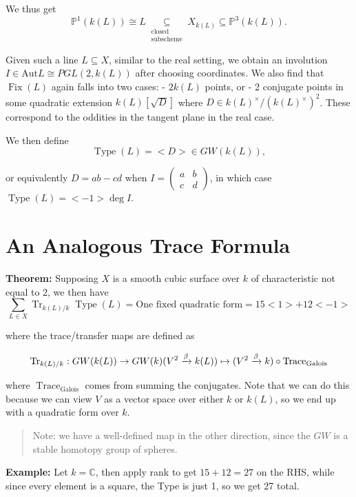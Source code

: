 \documentclass[11pt]{scrreprt}
\theoremstyle{definition}
\newcommand{\CC}[0]{{\mathbb{C}}}
\newcommand{\PP}[0]{{\mathbb{P}}}
\newcommand{\mapsvia}[1]{\xrightarrow{#1}}
\newcommand{\Aut}[0]{{\text{Aut}}}
\begin{document}
We thus get \[
\PP^1(k(L)) \cong L \underset{\substack{\text{closed}\\\text{subscheme}}}\subseteq X_{k(L)} \subseteq \PP^3(k(L)).
\]

Given such a line \(L\subseteq X\), similar to the real setting, we
obtain an involution \(I \in \Aut L \cong PGL(2, k(L))\) after choosing
coordinates. We also find that \(\operatorname{Fix}(L)\) again falls into two
cases: - \(2 k(L)\) points, or - 2 conjugate points in some quadratic
extension \(k(L)[\sqrt D]\) where
\(D \in k(L)^\times / (k(L)^\times)^2\). These correspond to the
oddities in the tangent plane in the real case.

We then define \[
\operatorname{Type}(L) = <D> \in GW(k(L)),
\]

or equivalently \(D=ab-cd\) when
\(I = \begin{pmatrix}a&b\\c&d\end{pmatrix}\), in which case
\(\operatorname{Type}(L) = <-1>\deg I\).

\hypertarget{an-analogous-trace-formula}{%
\section{An Analogous Trace Formula}\label{an-analogous-trace-formula}}

\textbf{Theorem:} Supposing \(X\) is a smooth cubic surface over \(k\)
of characteristic not equal to 2, we then have \[
\sum_{L \in X}\operatorname{Tr}_{k(L) / k}\operatorname{Type}(L) = \text{One fixed quadratic form} = 15<1> + 12<-1>
\]

where the trace/transfer maps are defined as

\[
\operatorname{Tr}_{k(L) / k}: GW(k(L)) \to GW(k) \\
(V^2 \mapsvia{\beta} k(L)) \mapsto (V^2 \mapsvia{\beta} k) \circ \operatorname{Trace}_\text{Galois}
\]

where \(\operatorname{Trace}_\text{Galois}\) comes from summing the
conjugates. Note that we can do this because we can view \(V\) as a
vector space over either \(k\) or \(k(L)\), so we end up with a
quadratic form over \(k\).

\begin{quote}
Note: we have a well-defined map in the other direction, since the
\(GW\) is a stable homotopy group of spheres.
\end{quote}

\textbf{Example:} Let \(k=\CC\), then apply rank to get \(15+12=27\) on
the RHS, while since every element is a square, the Type is just 1, so
we get 27 total.
\end{document}
